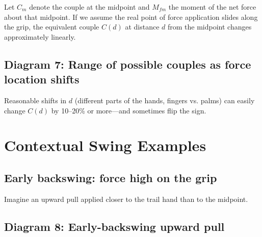\documentclass[12pt]{article}
\begin{document}
Let $C_m$ denote the couple at the midpoint and $M_{fm}$ the moment of the net force about that midpoint.  
If we assume the real point of force application slides along the grip, the equivalent couple $C(d)$ at distance $d$ from the midpoint changes approximately linearly.

\subsection*{Diagram 7: Range of possible couples as force location shifts}

\begin{center}
\end{center}

Reasonable shifts in $d$ (different parts of the hands, fingers vs. palms) can easily change $C(d)$ by 10--20\% or more—and sometimes flip the sign.

\section{Contextual Swing Examples}

\subsection{Early backswing: force high on the grip}

Imagine an upward pull applied closer to the trail hand than to the midpoint.

\subsection*{Diagram 8: Early-backswing upward pull}

\begin{center}
\end{center}
\end{document}
